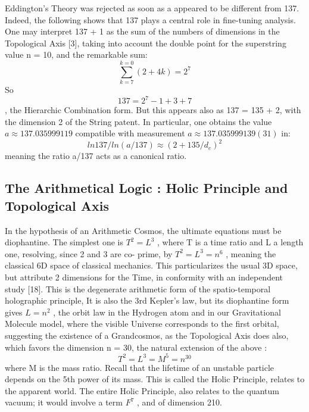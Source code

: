 \documentclass[twoside,draft]{article}
\begin{document}
{Eddington's Theory was rejected as soon as a appeared to be different from 137. Indeed, the
following shows that 137 plays a central role in fine-tuning analysis. One may interpret 137 + 1 as
the sum of the numbers of dimensions in the Topological Axis [3], taking into account the double
point for the superstring value n = 10, and the remarkable sum:
\begin{equation}
\sum_{k=7}^{k=0}(2 + 4 k ) = 2^{7}
\end{equation}
So 
\begin{equation}
137 = 2^{7} - 1 + 3 + 7
\end{equation}, the Hierarchic Combination form. But this appears also as 137 = 135 + 2,
with the dimension 2 of the String patent. In particular, one obtains the value $a \approx 137.035999119$
compatible with measurement $a \approx 137.035999139(31)$ in:
\begin{equation}
ln137/ln(a/137) \approx (2+135/d_{e})^{2}
\end{equation}
meaning the ratio a/137 acts as a canonical ratio.

\subsection{The Arithmetical Logic : Holic Principle and Topological Axis}

In the hypothesis of an Arithmetic Cosmos, the ultimate equations must be diophantine. The
simplest one is $T^{2} = L^{3}$ , where T is a time ratio and L a length one, resolving, since 2 and 3 are co-
prime, by $T^{2} = L^{3} = n^{6}$ , meaning the classical 6D space of classical mechanics. This particularizes
the usual 3D space, but attribute 2 dimensions for the Time, in conformity with an independent
study [18].
This is the degenerate arithmetic form of the spatio-temporal holographic principle, It is also the
3rd Kepler's law, but its diophantine form gives $L = n^{2}$ , the orbit law in the Hydrogen atom and in our
Gravitational Molecule model, where the visible Universe corresponds to the first orbital,
suggesting the existence of a Grandcosmos, as the Topological Axis does also, which favors the
dimension n = 30, the natural extension of the above :
\begin{equation}
T^{2} = L^{3} = M^{5} = n^{30}
\end{equation}
where M is the mass ratio. Recall that the lifetime of an unstable particle depends on the 5th power of its mass. This is called the Holic Principle, relates to the apparent world. The entire Holic
Principle, also relates to the quantum vacuum; it would involve a term $F^{7}$ , and of dimension 210.

}
\end{document}
